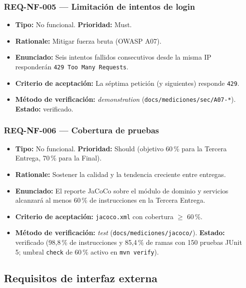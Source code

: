 \documentclass[12pt,a4paper]{article}
\begin{document}
\subsubsection{REQ-NF-005 — Limitación de intentos de login}
\begin{itemize}
  \item \textbf{Tipo:} No funcional. \textbf{Prioridad:} Must.
  \item \textbf{Rationale:} Mitigar fuerza bruta (OWASP A07).
  \item \textbf{Enunciado:} Seis intentos fallidos consecutivos desde la misma IP responderán
  \texttt{429 Too Many Requests}.
  \item \textbf{Criterio de aceptación:} La séptima petición (y siguientes) responde \texttt{429}.
  \item \textbf{Método de verificación:} \textit{demonstration}
  (\texttt{docs/mediciones/sec/A07-*}). \textbf{Estado:} verificado.
\end{itemize}

\subsubsection{REQ-NF-006 — Cobertura de pruebas}
\begin{itemize}
  \item \textbf{Tipo:} No funcional. \textbf{Prioridad:} Should (objetivo 60\,\% para la
  Tercera Entrega, 70\,\% para la Final).
  \item \textbf{Rationale:} Sostener la calidad y la tendencia creciente entre entregas.
  \item \textbf{Enunciado:} El reporte JaCoCo sobre el módulo de dominio y servicios alcanzará
  al menos 60\,\% de instrucciones en la Tercera Entrega.
  \item \textbf{Criterio de aceptación:} \texttt{jacoco.xml} con cobertura \(\ge\) 60\,\%.
  \item \textbf{Método de verificación:} \textit{test} (\texttt{docs/mediciones/jacoco/}).
  \textbf{Estado:} verificado (98,8\,\% de instrucciones y 85,4\,\% de ramas con 150 pruebas
  JUnit 5; umbral \texttt{check} de 60\,\% activo en \texttt{mvn verify}).
\end{itemize}

\subsection{Requisitos de interfaz externa}
\label{sec:interfaz}
\end{document}
